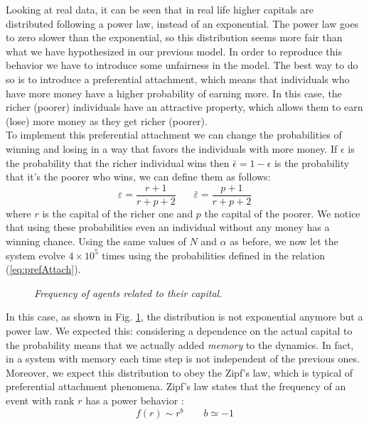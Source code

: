 Looking at real data, it can be seen that in real life higher capitals are distributed following a power law, instead of an exponential.
The power law goes to zero slower than the exponential, so this distribution seems more fair than what we have hypothesized in our previous model.
In order to reproduce this behavior we have to introduce some unfairness in the model.
The best way to do so is to introduce a preferential attachment, which means that individuals who have more money have a higher probability of earning more.
In this case, the richer (poorer) individuals have an attractive property, which allows them to earn (lose) more money as they get richer (poorer). \\
To implement this preferential attachment we can change the probabilities of winning and losing in a way that favors the individuals with more money.
If $\epsilon$ is the probability that the richer individual wins then $\bar{\epsilon} = 1 - \epsilon$ is the probability that it's the poorer who wins, we can define them as follows:
\begin{equation}
	\varepsilon = \frac{r + 1}{r + p + 2} \ \ \ \ \ \ \ \  \bar{\varepsilon} = \frac{p + 1}{r + p + 2}
	\label{eq:prefAttach}
\end{equation}
where $r$ is the capital of the richer one and $p$ the capital of the poorer.
We notice that using these probabilities even an individual without any money has a winning chance.
Using the same values of $N$ and $\alpha$ as before, we now let the system evolve $4 \times 10^5$ times using the probabilities defined in the relation (\ref{eq:prefAttach}).
\begin{figure}[H]
    \centering
    \scalebox{.7}{}
    \caption{\emph{Frequency of agents related to their capital.}}
    \label{fig:prefAttach}
\end{figure}
In this case, as shown in Fig. \ref{fig:prefAttach}, the distribution is not exponential anymore but a power law.
We expected this: considering a dependence on the actual capital to the probability means that we actually added \emph{memory} to the dynamics.
In fact, in a system with memory each time step is not independent of the previous ones.
\\Moreover, we expect this distribution to obey the Zipf's law, which is typical of preferential attachment phenomena.
Zipf's law states that the frequency of an event with rank $r$ has a power behavior \cite{zipf}:
\begin{equation}
    f(r) \sim r^b \ \ \ \ \ \ \ \ \ b \simeq -1
    \label{eq:zipf}
\end{equation}

